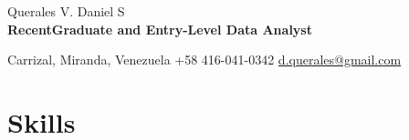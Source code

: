 \documentclass[11pt]{article} %
\def\autor{Querales V. Daniel S}
\def\ee{RecentGraduate and Entry-Level Data Analyst}
\begin{document}
\thispagestyle{empty}

{\LARGE \autor} \\ %
{\bfseries \ee}
\bigskip %

\faLocationArrow  \quad Carrizal, Miranda, Venezuela %
\quad \faPhone \quad +58 416-041-0342 %
\quad \faEnvelopeO \quad \href{mailto:d.querales@gmail.com}{d.querales@gmail.com} %

\faLinkedinSquare  {} %

\faGithub  {} %


\renewcommand{\abstractname}{}    %
\begin{abstract}
A Electrical Engineer (specialized in electronics) looking for an entry level data science position to fulfill my curiosity (and also play) in the big world of data
\end{abstract}
\bigskip



\section*{Skills}
\end{document}

